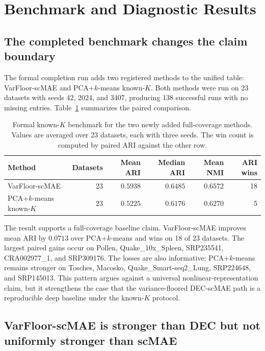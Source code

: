 \documentclass[11pt]{article}
\begin{document}
\section{Benchmark and Diagnostic Results}

\subsection{The completed benchmark changes the claim boundary}

The formal completion run adds two registered methods to the unified table: VarFloor-scMAE and PCA+$k$-means known-$K$. Both methods were run on 23 datasets with seeds 42, 2024, and 3407, producing 138 successful runs with no missing entries. Table~\ref{tab:formal-pca-varfloor} summarizes the paired comparison.

\begin{table}[ht]
\centering
\caption{Formal known-$K$ benchmark for the two newly added full-coverage methods. Values are averaged over 23 datasets, each with three seeds. The win count is computed by paired ARI against the other row.}
\label{tab:formal-pca-varfloor}
\begin{tabular}{lrrrrr}
\toprule
Method & Datasets & Mean ARI & Median ARI & Mean NMI & ARI wins \\
\midrule
VarFloor-scMAE & 23 & $0.5938$ & $0.6485$ & $0.6572$ & 18 \\
PCA+$k$-means known-$K$ & 23 & $0.5225$ & $0.6176$ & $0.6270$ & 5 \\
\bottomrule
\end{tabular}
\end{table}

The result supports a full-coverage baseline claim. VarFloor-scMAE improves mean ARI by $0.0713$ over PCA+$k$-means and wins on 18 of 23 datasets. The largest paired gains occur on Pollen, Quake\_10x\_Spleen, SRP235541, CRA002977\_1, and SRP309176. The losses are also informative: PCA+$k$-means remains stronger on Tosches, Macosko, Quake\_Smart-seq2\_Lung, SRP224648, and SRP145013. This pattern argues against a universal nonlinear-representation claim, but it strengthens the case that the variance-floored DEC-scMAE path is a reproducible deep baseline under the known-$K$ protocol.

\subsection{VarFloor-scMAE is stronger than DEC but not uniformly stronger than scMAE}
\end{document}
